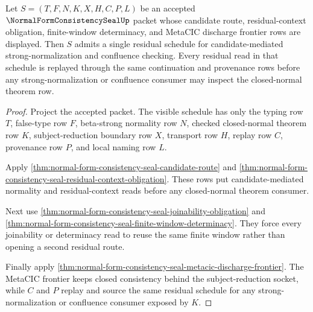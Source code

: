 \begin{theorem}
\label{thm:normal-form-consistency-seal-residual-schedule-discharge}
Let $S=(T,F,N,K,X,H,C,P,L)$ be an accepted $\NormalFormConsistencySealUp$ packet whose candidate route, residual-context obligation, finite-window determinacy, and MetaCIC discharge frontier rows are displayed. Then $S$ admits a single residual schedule for candidate-mediated strong-normalization and confluence checking. Every residual read in that schedule is replayed through the same continuation and provenance rows before any strong-normalization or confluence consumer may inspect the closed-normal theorem row.
\end{theorem}
\begin{proof}
Project the accepted packet. The visible schedule has only the typing row $T$, false-type row $F$, beta-strong normality row $N$, checked closed-normal theorem row $K$, subject-reduction boundary row $X$, transport row $H$, replay row $C$, provenance row $P$, and local naming row $L$.

Apply \autoref{thm:normal-form-consistency-seal-candidate-route} and \autoref{thm:normal-form-consistency-seal-residual-context-obligation}. These rows put candidate-mediated normality and residual-context reads before any closed-normal theorem consumer.

Next use \autoref{thm:normal-form-consistency-seal-joinability-obligation} and \autoref{thm:normal-form-consistency-seal-finite-window-determinacy}. They force every joinability or determinacy read to reuse the same finite window rather than opening a second residual route.

Finally apply \autoref{thm:normal-form-consistency-seal-metacic-discharge-frontier}. The MetaCIC frontier keeps closed consistency behind the subject-reduction socket, while $C$ and $P$ replay and source the same residual schedule for any strong-normalization or confluence consumer exposed by $K$.
\end{proof}

